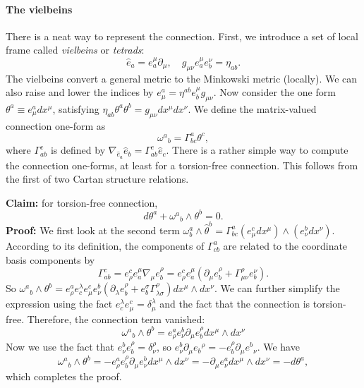\documentclass[aps,prb,superscriptaddress,nofootinbib]{revtex4}
\begin{document}
\paragraph*{The vielbeins}
There is a neat way to represent the connection.
First, we introduce a set of local frame called \textit{vielbeins} or \textit{tetrads}:
\begin{equation*}
	\hat e_a = e^\mu_a \partial_\mu, \quad
	g_{\mu\nu} e_a^\mu e_b^\nu = \eta_{ab}.
\end{equation*}
The vielbeins convert a general metric to the Minkowski metric (locally).
We can also raise and lower the indices by $e^a_\mu = \eta^{ab}e^\mu_b g_{\mu\nu}$.
Now consider the one form $\theta^a \equiv e^a_\mu dx^\mu$, satisfying $\eta_{ab}\theta^a\theta^b = g_{\mu\nu}dx^\mu dx^\nu$.
We define the matrix-valued connection one-form as
\begin{equation}
	\omega^a{}_b = \Gamma^a_{bc}\theta^c,
\end{equation}
where $\Gamma^c_{ab}$ is defined by $\nabla_{\hat e_a} \hat e_b = \Gamma^c_{ab} \hat e_c$.
There is a rather simple way to compute the connection one-forms, at least for a torsion-free connection. 
This follows from the first of two Cartan structure relations.

\noindent\textbf{Claim:} for torsion-free connection, 
\begin{equation}
	d{\theta}^a+\omega^a{}_b \wedge {\theta}^b=0.
\end{equation}
\textbf{Proof:} We first look at the second term
$\omega_b^a \wedge \hat{\theta}^b = \Gamma^a_{bc}\left(e_\mu^c d x^\mu\right) \wedge\left(e^b_\nu d x^\nu\right)$.
According to its definition, the components of $\Gamma_{c b}^a$ are related to the coordinate basis components by
$$
	\Gamma^c_{a b}  = e_\rho^c e_a^\mu \nabla_\mu e_b^\rho = e_\rho^c e_a^\mu(\partial_\mu e_b^\rho+ \Gamma^\rho_{\mu \nu}e_b^\nu).
$$
So $\omega^a{}_b \wedge {\theta}^b 
	=e_\rho^a e_c^\lambda e_\mu^c e^b_\nu\left(\partial_\lambda e_b^\rho+e_b^\sigma \Gamma^\rho_{\lambda \sigma}\right) d x^\mu \wedge d x^\nu$.
We can further simplify the expression using the fact $e_c^\lambda e_\mu^c=\delta_\mu^\lambda$ and the fact that the connection is torsion-free.
Therefore, the connection term vanished:
$$
	\omega^a{}_b \wedge {\theta}^b 
	=e_\rho^a e_\nu^b \partial_\mu e_b^\rho d x^\mu \wedge d x^\nu
$$
Now we use the fact that $e_\nu^b e_b^\rho=\delta_\nu^\rho$, so $e_\nu^b \partial_\mu e_b{ }^\rho=-e_b^\rho \partial_\mu e^b{ }_\nu$. We have
$$
	\omega^a{}_b \wedge {\theta}^b = -e^a_\rho e_b^\rho \partial_\mu e^b_\nu d x^\mu \wedge d x^\nu 
	=-\partial_\mu e^a_\nu d x^\mu \wedge d x^\nu=-d {\theta}^a,
$$
which completes the proof.
\end{document}
